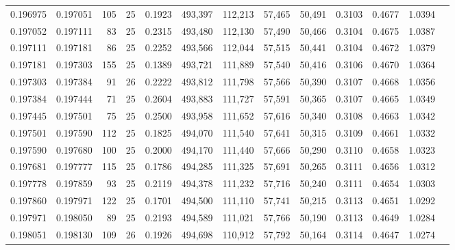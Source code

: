 \begin{tabular}{rrrrrrrrrrrrr}
0.196975 & 0.197051 &   105 &  25 &                                     0.1923 & 493,397 & 112,213 &  57,465 &  50,491 & 0.3103 & 0.4677 & 1.0394 \\
0.197052 & 0.197111 &    83 &  25 &                                     0.2315 & 493,480 & 112,130 &  57,490 &  50,466 & 0.3104 & 0.4675 & 1.0387 \\
0.197111 & 0.197181 &    86 &  25 &                                     0.2252 & 493,566 & 112,044 &  57,515 &  50,441 & 0.3104 & 0.4672 & 1.0379 \\
0.197181 & 0.197303 &   155 &  25 &                                     0.1389 & 493,721 & 111,889 &  57,540 &  50,416 & 0.3106 & 0.4670 & 1.0364 \\
0.197303 & 0.197384 &    91 &  26 &                                     0.2222 & 493,812 & 111,798 &  57,566 &  50,390 & 0.3107 & 0.4668 & 1.0356 \\
0.197384 & 0.197444 &    71 &  25 &                                     0.2604 & 493,883 & 111,727 &  57,591 &  50,365 & 0.3107 & 0.4665 & 1.0349 \\
0.197445 & 0.197501 &    75 &  25 &                                     0.2500 & 493,958 & 111,652 &  57,616 &  50,340 & 0.3108 & 0.4663 & 1.0342 \\
0.197501 & 0.197590 &   112 &  25 &                                     0.1825 & 494,070 & 111,540 &  57,641 &  50,315 & 0.3109 & 0.4661 & 1.0332 \\
0.197590 & 0.197680 &   100 &  25 &                                     0.2000 & 494,170 & 111,440 &  57,666 &  50,290 & 0.3110 & 0.4658 & 1.0323 \\
0.197681 & 0.197777 &   115 &  25 &                                     0.1786 & 494,285 & 111,325 &  57,691 &  50,265 & 0.3111 & 0.4656 & 1.0312 \\
0.197778 & 0.197859 &    93 &  25 &                                     0.2119 & 494,378 & 111,232 &  57,716 &  50,240 & 0.3111 & 0.4654 & 1.0303 \\
0.197860 & 0.197971 &   122 &  25 &                                     0.1701 & 494,500 & 111,110 &  57,741 &  50,215 & 0.3113 & 0.4651 & 1.0292 \\
0.197971 & 0.198050 &    89 &  25 &                                     0.2193 & 494,589 & 111,021 &  57,766 &  50,190 & 0.3113 & 0.4649 & 1.0284 \\
0.198051 & 0.198130 &   109 &  26 &                                     0.1926 & 494,698 & 110,912 &  57,792 &  50,164 & 0.3114 & 0.4647 & 1.0274 \\

\end{tabular}
